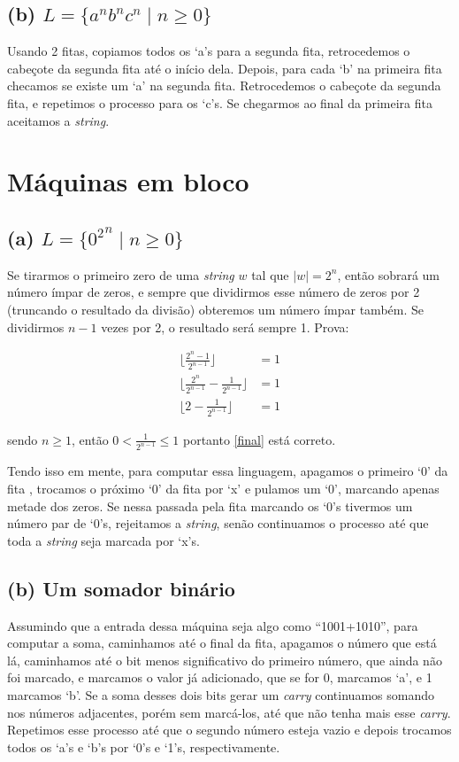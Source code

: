 \documentclass[12pt]{article}
\begin{document}
\subsection*{(b) \(L = \{a^n b^n c^n \mid n \geq 0\}\)}

Usando 2 fitas, copiamos todos os `a's para a segunda fita, retrocedemos o
cabeçote da segunda fita até o início dela. Depois, para cada `b' na primeira
fita checamos se existe um `a' na segunda fita. Retrocedemos o cabeçote da
segunda fita, e repetimos o processo para os `c's. Se chegarmos ao final da
primeira fita aceitamos a \textit{string}.

\section{Máquinas em bloco}

\subsection*{(a) \(L = \{{0^2}^n \mid n \geq 0\}\)}

Se tirarmos o primeiro zero de uma \textit{string} $w$ tal que $|w| = 2^n$,
então sobrará um número ímpar de zeros, e sempre que dividirmos esse número de
zeros por 2 (truncando o resultado da divisão) obteremos um número ímpar
também. Se dividirmos $n - 1$ vezes por 2, o resultado será sempre 1. Prova:

\begin{align}
	\lfloor\frac{2^n - 1}{2^{n-1}}\rfloor &= 1 \\
	\lfloor\frac{2^n}{2^{n-1}} - \frac{1}{2^{n-1}}\rfloor &= 1 \\
	\lfloor2 - \frac{1}{2^{n-1}}\rfloor &= 1 \label{final}
\end{align}

sendo $n \geq 1$, então $0 < \frac{1}{2^{n - 1}} \leq 1$ portanto \ref{final}
está correto.

Tendo isso em mente, para computar essa linguagem, apagamos o primeiro `0' da
fita , trocamos o próximo `0' da fita por `x' e pulamos um `0', marcando apenas
metade dos zeros. Se nessa passada pela fita marcando os `0's tivermos um
número par de `0's, rejeitamos a \textit{string}, senão continuamos o processo
até que toda a \textit{string} seja marcada por `x's.

\subsection*{(b) \rm Um somador binário}

Assumindo que a entrada dessa máquina seja algo como ``1001+1010'', para
computar a soma, caminhamos até o final da fita, apagamos o número que está lá,
caminhamos até o bit menos significativo do primeiro número, que ainda não foi
marcado, e marcamos o valor já adicionado, que se for 0, marcamos `a', e 1
marcamos `b'. Se a soma desses dois bits gerar um \textit{carry} continuamos
somando nos números adjacentes, porém sem marcá-los, até que não tenha mais
esse \textit{carry}. Repetimos esse processo até que o segundo número esteja
vazio e depois trocamos todos os `a's e `b's por `0's e `1's, respectivamente.
\end{document}
